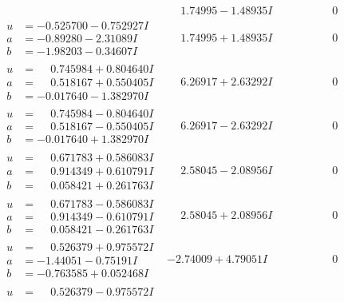 \documentclass[1p]{elsarticle_modified}
\theoremstyle{definition}
\begin{document}
$$\begin{array}{c|c|c}
 & \phantom{-}1.74995 - 1.48935 I & \phantom{-0.000000 } 0 \\ \hline\begin{aligned}
u &= -0.525700 - 0.752927 I \\
a &= -0.89280 - 2.31089 I \\
b &= -1.98203 - 0.34607 I\end{aligned}
 & \phantom{-}1.74995 + 1.48935 I & \phantom{-0.000000 } 0 \\ \hline\begin{aligned}
u &= \phantom{-}0.745984 + 0.804640 I \\
a &= \phantom{-}0.518167 + 0.550405 I \\
b &= -0.017640 - 1.382970 I\end{aligned}
 & \phantom{-}6.26917 + 2.63292 I & \phantom{-0.000000 } 0 \\ \hline\begin{aligned}
u &= \phantom{-}0.745984 - 0.804640 I \\
a &= \phantom{-}0.518167 - 0.550405 I \\
b &= -0.017640 + 1.382970 I\end{aligned}
 & \phantom{-}6.26917 - 2.63292 I & \phantom{-0.000000 } 0 \\ \hline\begin{aligned}
u &= \phantom{-}0.671783 + 0.586083 I \\
a &= \phantom{-}0.914349 + 0.610791 I \\
b &= \phantom{-}0.058421 + 0.261763 I\end{aligned}
 & \phantom{-}2.58045 - 2.08956 I & \phantom{-0.000000 } 0 \\ \hline\begin{aligned}
u &= \phantom{-}0.671783 - 0.586083 I \\
a &= \phantom{-}0.914349 - 0.610791 I \\
b &= \phantom{-}0.058421 - 0.261763 I\end{aligned}
 & \phantom{-}2.58045 + 2.08956 I & \phantom{-0.000000 } 0 \\ \hline\begin{aligned}
u &= \phantom{-}0.526379 + 0.975572 I \\
a &= -1.44051 - 0.75191 I \\
b &= -0.763585 + 0.052468 I\end{aligned}
 & -2.74009 + 4.79051 I & \phantom{-0.000000 } 0 \\ \hline\begin{aligned}
u &= \phantom{-}0.526379 - 0.975572 I \\

\end{aligned}
\end{array}$$
\end{document}
